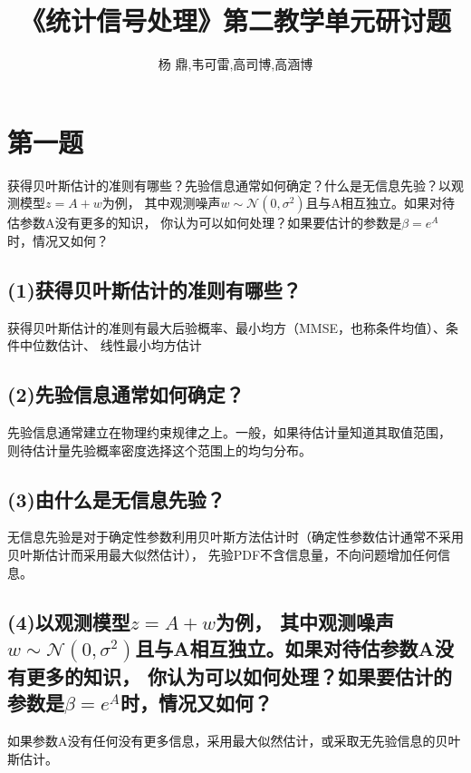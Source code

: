 \documentclass[fontset=windows]{article}
\title{\heiti\zihao{2} 《统计信号处理》第二教学单元研讨题}
\author{杨 鼎,韦可雷,高司博,高涵博}
\date{}
\numberwithin{figure}{section}
\begin{document}
\maketitle
\thispagestyle{empty}



\section{第一题}
获得贝叶斯估计的准则有哪些？先验信息通常如何确定？什么是无信息先验？以观测模型\(z=A+w\)为例，
其中观测噪声\(w\sim \mathcal{N}(0,\sigma^2)\)且与A相互独立。如果对待估参数A没有更多的知识，
你认为可以如何处理？如果要估计的参数是\(\beta=e^A\)时，情况又如何？


\subsection*{(1)获得贝叶斯估计的准则有哪些？}

获得贝叶斯估计的准则有最大后验概率、最小均方（MMSE，也称条件均值）、条件中位数估计、
线性最小均方估计

\subsection*{(2)先验信息通常如何确定？}

先验信息通常建立在物理约束规律之上。一般，如果待估计量知道其取值范围，
则待估计量先验概率密度选择这个范围上的均匀分布。

\subsection*{(3)由什么是无信息先验？}

无信息先验是对于确定性参数利用贝叶斯方法估计时（确定性参数估计通常不采用贝叶斯估计而采用最大似然估计），
先验PDF不含信息量，不向问题增加任何信息。

\subsection*{(4)以观测模型\(z=A+w\)为例，
	其中观测噪声\(w\sim \mathcal{N}(0,\sigma^2)\)且与A相互独立。如果对待估参数A没有更多的知识，
	你认为可以如何处理？如果要估计的参数是\(\beta=e^A\)时，情况又如何？}

如果参数A没有任何没有更多信息，采用最大似然估计，或采取无先验信息的贝叶斯估计。
\end{document}
